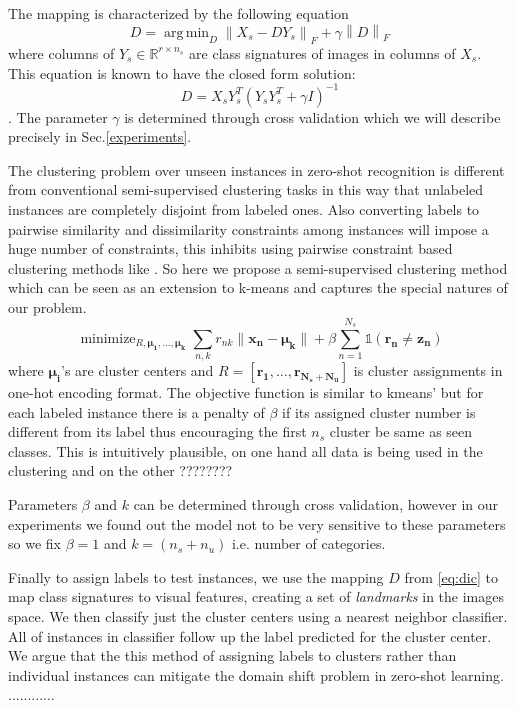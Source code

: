 \documentclass[10pt,twocolumn,letterpaper]{article}
\newcommand{\norm}[1]{\left \lVert #1 \right \rVert_{F}}
\DeclareMathOperator*{\argmin}{arg\,min}
\DeclareMathOperator*{\minimize}{minimize}
\begin{document}
The mapping is characterized by the following equation
\begin{equation}
  D = \argmin_D \norm{X_s - D Y_s} + \gamma \norm{D}
\end{equation}
where columns of $ Y_s \in \mathbb{R}^{r \times n_s} $  are class signatures of images in columns of $X_s$.
This equation is known to have the closed form solution:
\begin{equation} \label{eq:dic}
  D = X_s Y_s^T (Y_s Y_s^T + \gamma I)^{-1}
\end{equation}.
The parameter $\gamma$ is determined through cross validation which we will describe precisely in Sec.\ref{experiments}.

The clustering problem over unseen instances in zero-shot recognition is
 different from conventional semi-supervised clustering tasks \cite{}
in this way that unlabeled instances are completely disjoint from labeled ones.
Also converting labels to pairwise similarity and dissimilarity constraints among instances will impose
a huge number of constraints, this inhibits using pairwise constraint based clustering methods like \cite{}.
 So here we propose a semi-supervised clustering method which
can be seen as an extension to k-means and captures the special natures of our problem.
\begin{equation}
\minimize_{R, \mathbf{\mu_1, \ldots, \mu_k }}  \sum_{n,k} r_{nk} \lVert \mathbf{x_n - \mu_k} \rVert +
 \beta \sum_{n=1}^{N_s} \mathds{1}(\mathbf{r_n \neq z_n})
\end{equation}
where $\mathbf{\mu_i}$'s are cluster centers and $R = [\mathbf{r_1, \ldots, r_{N_s + N_u }} ]$ is cluster assignments in one-hot encoding format.
The objective function is similar to kmeans' but for each labeled instance there is a penalty of $\beta$ if its assigned cluster number is different from its label thus encouraging
the first $n_s$ cluster be same as seen classes. This is intuitively plausible, on one hand all data is being used
in the clustering and on the other ????????

Parameters $\beta$ and $k$ can be determined through cross validation, however in our experiments we found out
the model not to be very sensitive to these parameters so we fix $\beta=1$ and $k =  (n_s + n_u)$ i.e. number of categories.

Finally to assign labels to test instances, we use the mapping $D$ from \eqref{eq:dic} to map class signatures to visual
features, creating a set of \textit{landmarks} in the images space. We then classify just the cluster centers using a
nearest neighbor classifier. All of instances in classifier follow up the label predicted for the cluster center.
We argue that the this method of assigning labels to clusters rather than individual instances can mitigate the
domain shift problem in zero-shot learning.
............
\end{document}
